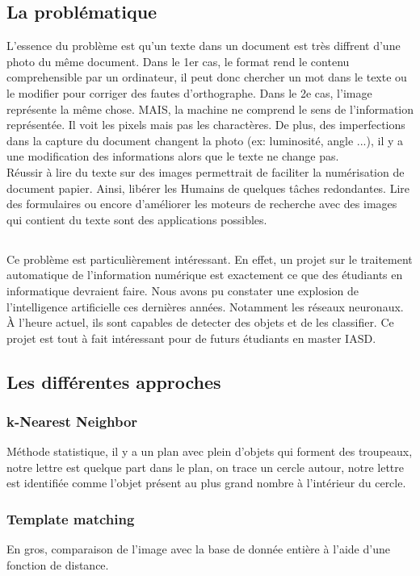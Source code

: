 \documentclass[a4paper]{article}
\begin{document}
		\subsection{La problématique}
			L'essence du problème est qu'un texte dans un document est très diffrent d'une photo du même document. Dans le 1er cas, le format rend le contenu comprehensible par un ordinateur, il peut donc 
			chercher un mot dans le texte ou le modifier pour corriger des fautes d'orthographe. Dans le 2e cas, l'image représente la même chose. MAIS, la machine ne comprend le sens de l'information 
			représentée. Il voit les pixels mais pas les charactères. De plus, des imperfections dans la capture du document changent la photo (ex: luminosité, angle ...), il y a une modification des informations
			alors que le texte ne change pas.
			\\Réussir à lire du texte sur des images permettrait de faciliter la numérisation de document papier. Ainsi, libérer les Humains de quelques tâches redondantes. Lire des formulaires ou encore d'améliorer les moteurs de recherche avec des images qui contient du texte sont des applications possibles.
		\subsection*{}
			Ce problème est particulièrement intéressant. En effet, un projet sur le traitement automatique de l'information numérique est exactement ce que des étudiants en informatique devraient faire. Nous avons pu constater une explosion
			de l'intelligence artificielle ces dernières années. Notamment les réseaux neuronaux. À l'heure actuel, ils sont capables de detecter des objets et de les classifier. Ce projet est tout à fait 
			intéressant pour de futurs étudiants en master IASD.
		\subsection{Les différentes approches}
			\subsubsection{k-Nearest Neighbor}
				Méthode statistique, il y a un plan avec plein d'objets qui forment des troupeaux, notre lettre est quelque part dans le plan, on trace un cercle autour, notre lettre est identifiée comme l'objet présent au plus grand nombre à l'intérieur du cercle.
			\subsubsection{Template matching} 
				En gros, comparaison de l'image avec la base de donnée entière à l'aide d'une fonction de distance. 
\end{document}
